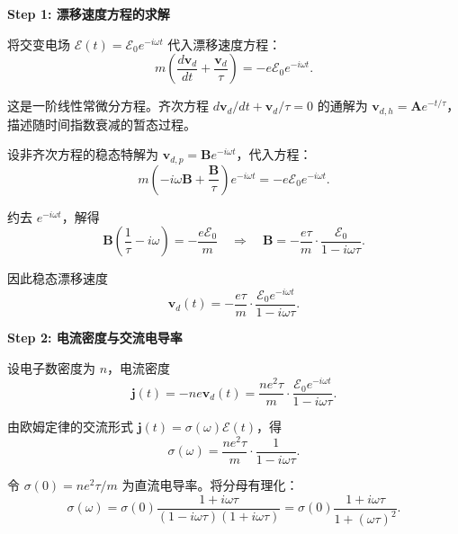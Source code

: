 \begin{derivationbox}[标准解题过程]
\textbf{Step 1: 漂移速度方程的求解}

将交变电场 $\bm{\mathcal{E}}(t)=\bm{\mathcal{E}}_0e^{-i\omega t}$ 代入漂移速度方程：
\begin{equation}
m\left(\frac{d\bm{v}_d}{dt}+\frac{\bm{v}_d}{\tau}\right)=-e\bm{\mathcal{E}}_0e^{-i\omega t}.
\end{equation}

这是一阶线性常微分方程。齐次方程 $d\bm{v}_d/dt+\bm{v}_d/\tau=0$ 的通解为 $\bm{v}_{d,h}=\bm{A}e^{-t/\tau}$，描述随时间指数衰减的暂态过程。

设非齐次方程的稳态特解为 $\bm{v}_{d,p}=\bm{B}e^{-i\omega t}$，代入方程：
\begin{equation}
m\left(-i\omega\bm{B}+\frac{\bm{B}}{\tau}\right)e^{-i\omega t}=-e\bm{\mathcal{E}}_0e^{-i\omega t}.
\end{equation}

约去 $e^{-i\omega t}$，解得
\begin{equation}
\bm{B}\left(\frac{1}{\tau}-i\omega\right)=-\frac{e\bm{\mathcal{E}}_0}{m}
\quad\Longrightarrow\quad
\bm{B}=-\frac{e\tau}{m}\cdot\frac{\bm{\mathcal{E}}_0}{1-i\omega\tau}.
\end{equation}

因此稳态漂移速度
\begin{equation}
\bm{v}_d(t)=-\frac{e\tau}{m}\cdot\frac{\bm{\mathcal{E}}_0e^{-i\omega t}}{1-i\omega\tau}.
\end{equation}

\textbf{Step 2: 电流密度与交流电导率}

设电子数密度为 $n$，电流密度
\begin{equation}
\bm{j}(t)=-ne\bm{v}_d(t)=\frac{ne^2\tau}{m}\cdot\frac{\bm{\mathcal{E}}_0e^{-i\omega t}}{1-i\omega\tau}.
\end{equation}

由欧姆定律的交流形式 $\bm{j}(t)=\sigma(\omega)\bm{\mathcal{E}}(t)$，得
\begin{equation}
\sigma(\omega)=\frac{ne^2\tau}{m}\cdot\frac{1}{1-i\omega\tau}.
\end{equation}

令 $\sigma(0)=ne^2\tau/m$ 为直流电导率。将分母有理化：
\begin{equation}
\sigma(\omega)=\sigma(0)\frac{1+i\omega\tau}{(1-i\omega\tau)(1+i\omega\tau)}
=\boxed{\sigma(0)\frac{1+i\omega\tau}{1+(\omega\tau)^2}.}
\end{equation}
\end{derivationbox}

